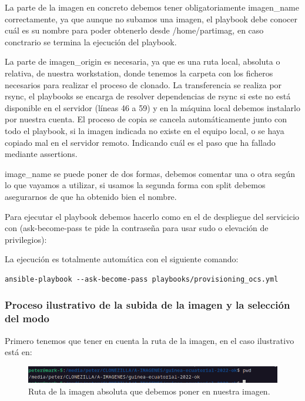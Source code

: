 La parte de la imagen en concreto debemos tener obligatoriamente imagen\_name correctamente, ya que aunque no subamos una imagen, el playbook debe conocer cuál es su nombre 
para poder obtenerlo desde /home/partimag, en caso conctrario se termina la ejecución del playbook.
\vspace{5mm}

La parte de imagen\_origin es necesaria, ya que es una ruta local, absoluta o relativa, de nuestra workstation, donde tenemos la carpeta con los ficheros necesarios para realizar el proceso
de clonado. La transferencia se realiza por rsync, el playbooks se encarga de resolver dependencias de rsync si este no está disponible en el servidor (líneas 46 a 59) y en la máquina local debemos instalarlo por nuestra cuenta. 
El proceso de copia se cancela automáticamente junto con todo el playbook, si la imagen indicada no existe en el equipo local, o se haya copiado mal en el servidor remoto. Indicando cuál es el paso 
que ha fallado mediante assertions.
\vspace{5mm}

image\_name se puede poner de dos formas, debemos comentar una o otra según lo que vayamos a utilizar, si usamos la segunda forma con split debemos asegurarnos de que ha obtenido
bien el nombre.
\vspace{5mm}

Para ejecutar el playbook debemos hacerlo como en el de despliegue del servicicio con (ask-become-pass te pide la contraseña para usar sudo o elevación de privilegios): 
\vspace{5mm}

La ejecución es totalmente automática con el siguiente comando:
\begin{lstlisting}[style=mybash]
ansible-playbook --ask-become-pass playbooks/provisioning_ocs.yml
\end{lstlisting}

\newpage
\subsubsection{Proceso ilustrativo de la subida de la imagen y la selección del modo}

Primero tenemos que tener en cuenta la ruta de la imagen, en el caso ilustrativo está en:

\begin{figure}[H]
	\centering
	\includegraphics[scale=0.30]{provisioning-ocs/provisioning01}
	\caption{Ruta de la imagen absoluta que debemos poner en nuestra imagen.}
\end{figure}

